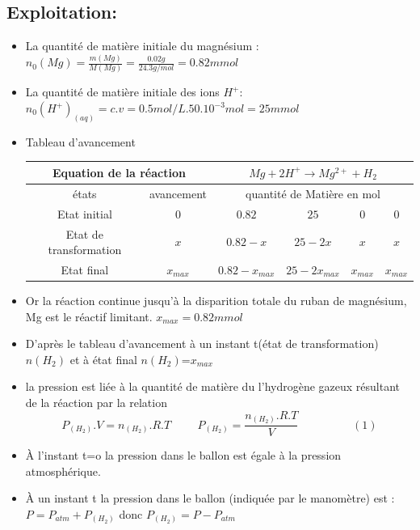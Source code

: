 \documentclass[12pt]{article}
\begin{document}
\subsection{Exploitation:}
\begin{itemize}
	\item La quantité de matière initiale du magnésium : $n_0(Mg) = \frac{m(Mg)}{M(Mg)} = \frac{0.02g}{24.3g/mol} = 0.82mmol$
	\item La quantité de matière initiale des ions $H^+$: ${n_0(H^+)}_{(aq)} = c.v = 0.5mol/L . 50.10^{-3}mol = 25mmol$
\item Tableau d'avancement

\begin{tabular}{|c|c|c|c|c|c|}
    \hline
	\multicolumn{2}{|c|}{Equation de la réaction}& \multicolumn{4}{c|}{$ Mg + 2H^+ \rightarrow  Mg^{2+} + H_2$}\\\hline
    états  & avancement& \multicolumn{4}{|c|}{quantité de Matière en mol}\\\hline
    Etat initial          &    0    & $ 0.82$   & $ 25$  & $ 0$     & $ 0$ \\\hline
    Etat de transformation&    $x$  & $ 0.82- x$ & $ 25-2x$ & $ x$        & $ x$ \\\hline
    Etat final            &    $x_{max}$& $ 0.82-x_{max}$ & $25- 2x_{max}$& $x_{max}$  & $  x_{max}$ \\\hline
\end{tabular}

\item Or la réaction continue jusqu'à la disparition totale du ruban de magnésium, Mg est le réactif limitant. $x_{max} = 0.82mmol$ 
\item D'après le tableau d'avancement à un instant t(état de transformation) $n(H_2)$ et à état final $n(H_2)$=$x_{max}$

\item la pression est liée à la quantité de matière du l'hydrogène gazeux résultant de la réaction par la relation $${P}_{(H_2)}.V = n_{(H_2)}.R.T \hspace{1cm} P_{(H_2)} =\frac{n_{(H_2)}.R.T}{V} \hspace{2cm}  (1)$$

\item À l'instant t=o la pression dans le ballon est égale à la pression atmosphérique. 
\item À un instant t la pression dans le ballon (indiquée par le manomètre) est : $P = P_{atm} + P_{(H_2)}$ donc $P_{(H_2)}= P-P_{atm}$


\end{itemize}
\end{document}
